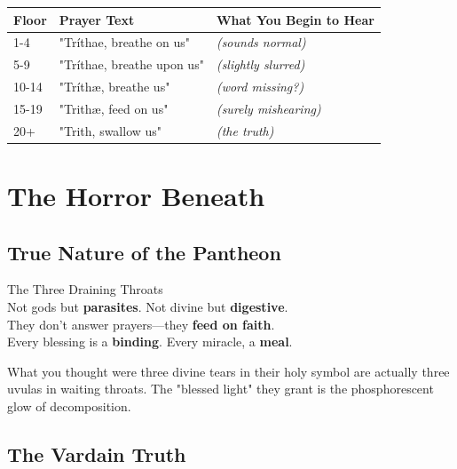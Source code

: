 \documentclass[11pt,a4paper,twoside]{book}
\begin{document}
\begin{adjustwidth}{1em}{1em}
\begin{tabular}{p{2cm}p{4cm}p{4cm}}
\textbf{Floor} & \textbf{Prayer Text} & \textbf{What You Begin to Hear} \\
\hline
1-4 & "Tríthae, breathe on us" & \textit{(sounds normal)} \\
5-9 & "Tríthae, breathe upon us" & \textit{(slightly slurred)} \\
10-14 & "Tríthæ, breathe us" & \textit{(word missing?)} \\
15-19 & "Trithæ, feed on us" & \textit{(surely mishearing)} \\
20+ & "Trith, swallow us" & \textit{(the truth)} \\
\end{tabular}
\end{adjustwidth}

\chapter{The Horror Beneath}

\section{True Nature of the Pantheon}

\begin{tcolorbox}[horrorbox={The Dæl Trith}]
\centering
\runefont\Large
The Three Draining Throats\\
\normalfont
\vspace{1em}
Not gods but \textbf{parasites}. Not divine but \textbf{digestive}.\\
They don't answer prayers—they \textbf{feed on faith}.\\
Every blessing is a \textbf{binding}. Every miracle, a \textbf{meal}.
\end{tcolorbox}

What you thought were three divine tears in their holy symbol are actually three uvulas in waiting throats. The "blessed light" they grant is the phosphorescent glow of decomposition.

\section{The Vardain Truth}

\begin{center}
\end{center}
\end{document}
